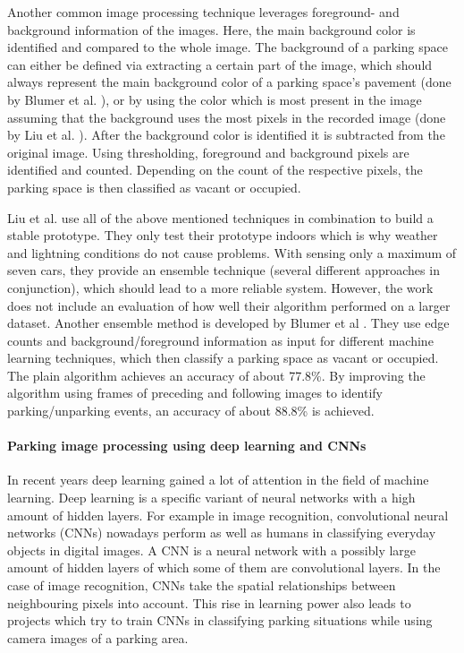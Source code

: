 Another common image processing technique leverages foreground- and background information of the images. Here, the main background color is identified and compared to the whole image. The background of a parking space can either be defined via extracting a certain part of the image, which should always represent the main background color of a parking space's pavement (done by Blumer et al. \cite{Blumer2012}), or by using the color which is most present in the image assuming that the background uses the most pixels in the recorded image (done by Liu et al. \cite{stationary_camera_sensing}). After the background color is identified it is subtracted from the original image. Using thresholding, foreground and background pixels are identified and counted. Depending on the count of the respective pixels, the parking space is then classified as vacant or occupied.

Liu et al. \cite{stationary_camera_sensing} use all of the above mentioned techniques in combination to build a stable prototype. They only test their prototype indoors which is why weather and lightning conditions do not cause problems. With sensing only a maximum of seven cars, they provide an ensemble technique (several different approaches in conjunction), which should lead to a more reliable system. However, the work does not include an evaluation of how well their algorithm performed on a larger dataset. Another ensemble method is developed by Blumer et al \cite{Blumer2012}. They use edge counts and background/foreground information as input for different machine learning techniques, which then classify a parking space as vacant or occupied. The plain algorithm achieves an accuracy of about 77.8\%. By improving the algorithm using frames of preceding and following images to identify parking/unparking events, an accuracy of about 88.8\% is achieved.



\paragraph{Parking image processing using deep learning and CNNs}

In recent years deep learning gained a lot of attention in the field of machine learning. Deep learning is a specific variant of neural networks with a high amount of hidden layers. For example in image recognition, convolutional neural networks (CNNs) nowadays perform as well as humans in classifying everyday objects in digital images. A CNN is a neural network with a possibly large amount of hidden layers of which some of them are convolutional layers. In the case of image recognition, CNNs take the spatial relationships between neighbouring pixels into account. This rise in learning power also leads to projects which try to train CNNs in classifying parking situations while using camera images of a parking area.

